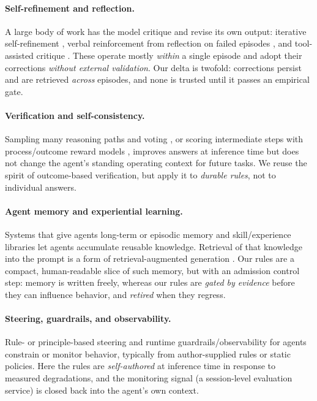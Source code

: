 \documentclass[letterpaper]{article} %
\begin{document}
\paragraph{Self-refinement and reflection.} A large body of work has the model critique and
revise its own output: iterative self-refinement \citep{placeholder-selfrefine}, verbal
reinforcement from reflection on failed episodes \citep{placeholder-reflexion}, and
tool-assisted critique \citep{placeholder-critic}. These operate mostly \emph{within} a single
episode and adopt their corrections \emph{without external validation}. Our delta is twofold:
corrections persist and are retrieved \emph{across} episodes, and none is trusted until it
passes an empirical gate.

\paragraph{Verification and self-consistency.} Sampling many reasoning paths and voting
\citep{placeholder-selfconsistency}, or scoring intermediate steps with process/outcome reward
models \citep{placeholder-processreward,placeholder-llmjudge}, improves answers at inference
time but does not change the agent's standing operating context for future tasks. We reuse the
spirit of outcome-based verification, but apply it to \emph{durable rules}, not to individual
answers.

\paragraph{Agent memory and experiential learning.} Systems that give agents long-term or
episodic memory \citep{placeholder-memgpt,placeholder-genagents} and skill/experience libraries
\citep{placeholder-voyager,placeholder-expel} let agents accumulate reusable knowledge.
Retrieval of that knowledge into the prompt is a form of retrieval-augmented generation
\citep{placeholder-rag}. Our rules are a compact, human-readable slice of such memory, but with
an admission control step: memory is written freely, whereas our rules are \emph{gated by
evidence} before they can influence behavior, and \emph{retired} when they regress.

\paragraph{Steering, guardrails, and observability.} Rule- or principle-based steering
\citep{placeholder-constitutional} and runtime guardrails/observability for agents
\citep{placeholder-guardrails} constrain or monitor behavior, typically from author-supplied
rules or static policies. Here the rules are \emph{self-authored} at inference time in response
to measured degradations, and the monitoring signal (a session-level evaluation service) is
closed back into the agent's own context.
\end{document}
